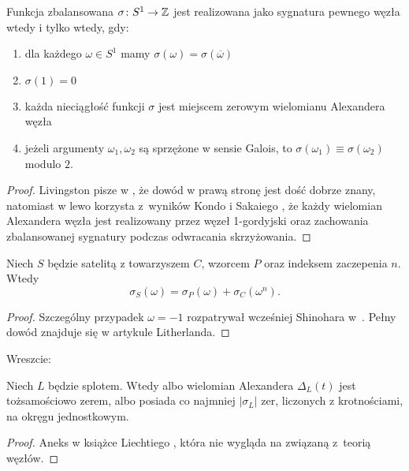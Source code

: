 \begin{proposition}
\label{balanced_iff_four_conditions}%
    Funkcja zbalansowana $\sigma \colon S^1 \to \mathbb Z$ jest realizowana jako sygnatura pewnego węzła wtedy i tylko wtedy, gdy:
    \begin{enumerate}
        \item dla każdego $\omega \in S^1$ mamy $\sigma(\omega) = \sigma(\overline{\omega})$
        \item $\sigma(1) = 0$
        \item każda nieciągłość funkcji $\sigma$ jest miejscem zerowym wielomianu Alexandera węzła
        \item jeżeli argumenty $\omega_1, \omega_2$ są sprzężone w sensie Galois, to $\sigma(\omega_1) \equiv \sigma(\omega_2)$ modulo $2$.
    \end{enumerate}
\end{proposition}

\begin{proof}
    Livingston pisze w \cite{livingston18}, że dowód w prawą stronę jest dość dobrze znany, natomiast w lewo korzysta z~wyników Kondo \cite{kondo79} i Sakaiego \cite{sakai77}, że każdy wielomian Alexandera węzła jest realizowany przez węzeł 1-gordyjski oraz zachowania zbalansowanej sygnatury podczas odwracania skrzyżowania.
\end{proof}

\begin{proposition}
%
    Niech $S$ będzie satelitą z towarzyszem $C$, wzorcem $P$ oraz indeksem zaczepenia $n$.
    Wtedy
    \begin{equation}
        \sigma_S(\omega) = \sigma_P(\omega) + \sigma_C(\omega^n).
    \end{equation}
\end{proposition}

\begin{proof}
    Szczególny przypadek $\omega = -1$ rozpatrywał wcześniej Shinohara w~\cite{shinohara71}.
    Pełny dowód znajduje się w artykule \cite{litherland79} Litherlanda.
\end{proof}

Wreszcie:

\begin{proposition}
    Niech $L$ będzie splotem.
    Wtedy albo wielomian Alexandera $\Delta_L(t)$ jest tożsamościowo zerem, albo posiada co najmniej $|\sigma_L|$ zer, liczonych z krotnościami, na okręgu jednostkowym.
\end{proposition}

\begin{proof}
    Aneks w książce Liechtiego \cite{liechti16}, która nie wygląda na związaną z~teorią węzłów.
\end{proof}



